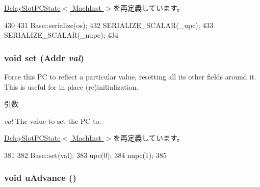 \hyperlink{classGenericISA_1_1DelaySlotPCState_a53e036786d17361be4c7320d39c99b84}{DelaySlotPCState$<$ MachInst $>$}を再定義しています。


\begin{DoxyCode}
430     {
431         Base::serialize(os);
432         SERIALIZE_SCALAR(_upc);
433         SERIALIZE_SCALAR(_nupc);
434     }
\end{DoxyCode}
\hypertarget{classGenericISA_1_1DelaySlotUPCState_a9a5b900e841dd75dc81970850547918f}{
\subsubsection[{set}]{\setlength{\rightskip}{0pt plus 5cm}void set ({\bf Addr} {\em val})}}
\label{classGenericISA_1_1DelaySlotUPCState_a9a5b900e841dd75dc81970850547918f}
Force this PC to reflect a particular value, resetting all its other fields around it. This is useful for in place (re)initialization.


\begin{DoxyParams}{引数}
\item[{\em val}]The value to set the PC to. \end{DoxyParams}


\hyperlink{classGenericISA_1_1DelaySlotPCState_a9a5b900e841dd75dc81970850547918f}{DelaySlotPCState$<$ MachInst $>$}を再定義しています。


\begin{DoxyCode}
381     {
382         Base::set(val);
383         upc(0);
384         nupc(1);
385     }
\end{DoxyCode}
\hypertarget{classGenericISA_1_1DelaySlotUPCState_a5e17a0358d00a918a1b1b9beeed380d1}{
\subsubsection[{uAdvance}]{\setlength{\rightskip}{0pt plus 5cm}void uAdvance ()}}
\label{classGenericISA_1_1DelaySlotUPCState_a5e17a0358d00a918a1b1b9beeed380d1}




